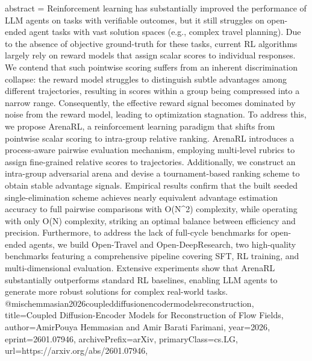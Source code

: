 {      abstract = {Reinforcement learning has substantially improved the performance of LLM agents on tasks with verifiable outcomes, but it still struggles on open-ended agent tasks with vast solution spaces (e.g., complex travel planning). Due to the absence of objective ground-truth for these tasks, current RL algorithms largely rely on reward models that assign scalar scores to individual responses. We contend that such pointwise scoring suffers from an inherent discrimination collapse: the reward model struggles to distinguish subtle advantages among different trajectories, resulting in scores within a group being compressed into a narrow range. Consequently, the effective reward signal becomes dominated by noise from the reward model, leading to optimization stagnation. To address this, we propose ArenaRL, a reinforcement learning paradigm that shifts from pointwise scalar scoring to intra-group relative ranking. ArenaRL introduces a process-aware pairwise evaluation mechanism, employing multi-level rubrics to assign fine-grained relative scores to trajectories. Additionally, we construct an intra-group adversarial arena and devise a tournament-based ranking scheme to obtain stable advantage signals. Empirical results confirm that the built seeded single-elimination scheme achieves nearly equivalent advantage estimation accuracy to full pairwise comparisons with O(N^2) complexity, while operating with only O(N) complexity, striking an optimal balance between efficiency and precision. Furthermore, to address the lack of full-cycle benchmarks for open-ended agents, we build Open-Travel and Open-DeepResearch, two high-quality benchmarks featuring a comprehensive pipeline covering SFT, RL training, and multi-dimensional evaluation. Extensive experiments show that ArenaRL substantially outperforms standard RL baselines, enabling LLM agents to generate more robust solutions for complex real-world tasks.}
}@misc{hemmasian2026coupleddiffusionencodermodelsreconstruction,
      title={Coupled Diffusion-Encoder Models for Reconstruction of Flow Fields}, 
      author={AmirPouya Hemmasian and Amir Barati Farimani},
      year={2026},
      eprint={2601.07946},
      archivePrefix={arXiv},
      primaryClass={cs.LG},
      url={https://arxiv.org/abs/2601.07946},
}
